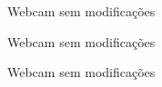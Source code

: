\begin{figure}[ht!]
\centering
{}
  \caption{Webcam sem modificações}
  \label{fig:webcam03}
\end{figure} 

\begin{figure}[ht!]
\centering
{}
  \caption{Webcam sem modificações}
  \label{fig:webcam04}
\end{figure} 

\begin{figure}[ht!]
\centering
{}
  \caption{Webcam sem modificações}
  \label{fig:webcam05}
\end{figure} 